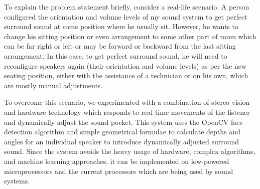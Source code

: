 \documentclass[../../../patent_v1.tex]{subfiles}
\begin{document}
To explain the problem statement briefly, consider a real-life scenario. A person 
configured the orientation and volume levels of my sound system to get perfect 
surround sound at some position where he usually sit. However, he wants to 
change his sitting position or even arrangement to some other part of room 
which can be far right or left or may be forward or backward from the last sitting 
arrangement. In this case, to get perfect surround sound, he will need to reconfigure  
speakers again (their orientation and volume levels) as per the new seating 
position, either with the assistance of a technician or on his own, which are mostly 
manual adjustments.

To overcome this scenario, we experimented with a combination of stereo vision and 
hardware technology which responds to real-time movements of the listener and dynamically 
adjust the sound pocket. This system uses the OpenCV face detection algorithm and 
simple geometrical formulae to calculate depths and angles for an individual speaker 
to introduce dynamically adjusted surround sound. Since the system avoids the heavy 
usage of hardware, complex algorithms, and machine learning approaches, it can be 
implemented on low-powered microprocessors and the current processors which are being used by 
sound systems.
\end{document}
